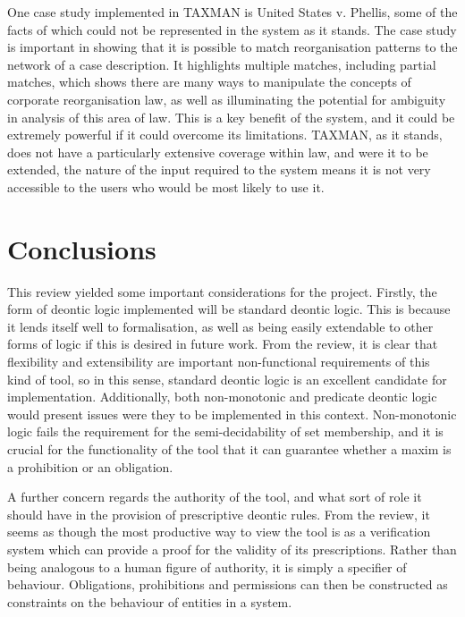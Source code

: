 \documentclass{l4proj}
\begin{document}
One case study implemented in TAXMAN is United States v. Phellis, some of the facts of which could not be represented in the system as it stands. The case study is important in showing that it is possible to match reorganisation patterns to the network of a case description. It highlights multiple matches, including partial matches, which shows there are many ways to manipulate the concepts of corporate reorganisation law, as well as illuminating the potential for ambiguity in analysis of this area of law. This is a key benefit of the system, and it could be extremely powerful if it could overcome its limitations. TAXMAN, as it stands, does not have a particularly extensive coverage within law, and were it to be extended, the nature of the input required to the system means it is not very accessible to the users who would be most likely to use it. 

\section{Conclusions}
This review yielded some important considerations for the project. Firstly, the form of deontic logic implemented will be standard deontic logic. This is because it lends itself well to formalisation, as well as being easily extendable to other forms of logic if this is desired in future work. From the review, it is clear that flexibility and extensibility are important non-functional requirements of this kind of tool, so in this sense, standard deontic logic is an excellent candidate for implementation. Additionally, both non-monotonic and predicate deontic logic would present issues were they to be implemented in this context. Non-monotonic logic fails the requirement for the semi-decidability of set membership, and it is crucial for the functionality of the tool that it can guarantee whether a maxim is a prohibition or an obligation. 

A further concern regards the authority of the tool, and  what sort of role it should have in the provision of prescriptive deontic rules. From the review, it seems as though the most productive way to view the tool is as a verification system which can provide a proof for the validity of its prescriptions. Rather than being analogous to a human figure of authority, it is simply a specifier of behaviour. Obligations, prohibitions and permissions can then be constructed as constraints on the behaviour of entities in a system. 
\end{document}
